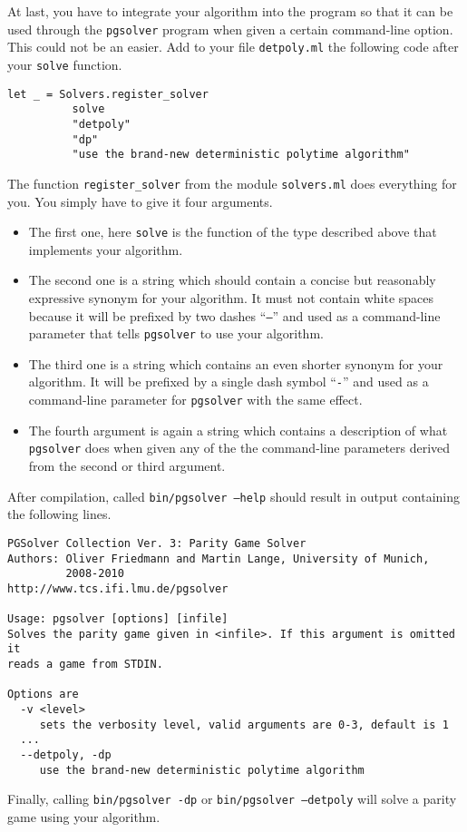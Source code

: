 At last, you have to integrate your algorithm into the program so that it can be used through the
\texttt{pgsolver} program when given a certain command-line option. This could not be an easier. Add to
your file \texttt{detpoly.ml} the following code after your \texttt{solve} function.
\begin{verbatim}
let _ = Solvers.register_solver
          solve
          "detpoly"
          "dp"
          "use the brand-new deterministic polytime algorithm"
\end{verbatim}
The function \texttt{register\_solver} from the module \texttt{solvers.ml} does everything for you. You
simply have to give it four arguments.
\begin{itemize}
\item The first one, here \texttt{solve} is the function of the type described above that implements
      your algorithm.
\item The second one is a string which should contain a concise but reasonably expressive synonym for your
      algorithm. It must not contain white spaces because it will be prefixed by two dashes ``\texttt{--}''
      and used as a command-line parameter that tells \texttt{pgsolver} to use your algorithm.
\item The third one is a string which contains an even shorter synonym for your algorithm. It will be
      prefixed by a single dash symbol ``\texttt{-}'' and used as a command-line parameter for \texttt{pgsolver}
      with the same effect.
\item The fourth argument is again a string which contains a description of what \texttt{pgsolver} does
      when given any of the the command-line parameters derived from the second or third argument.
\end{itemize}
After compilation, called \texttt{bin/pgsolver --help} should result in output containing the following
lines.
\begin{verbatim}
PGSolver Collection Ver. 3: Parity Game Solver
Authors: Oliver Friedmann and Martin Lange, University of Munich,
         2008-2010
http://www.tcs.ifi.lmu.de/pgsolver

Usage: pgsolver [options] [infile]
Solves the parity game given in <infile>. If this argument is omitted it
reads a game from STDIN.

Options are
  -v <level>
     sets the verbosity level, valid arguments are 0-3, default is 1
  ...
  --detpoly, -dp
     use the brand-new deterministic polytime algorithm
\end{verbatim}
Finally, calling \texttt{bin/pgsolver -dp} or \texttt{bin/pgsolver --detpoly} will solve a parity game
using your algorithm.

